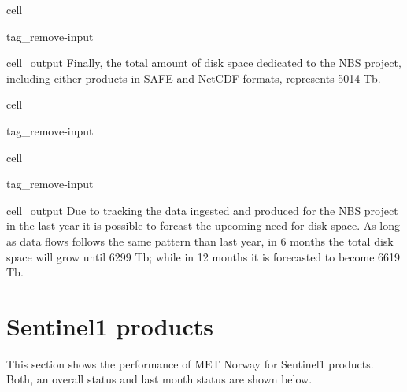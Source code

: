 \documentclass[letterpaper,10pt,english]{jupyterBook}
\begin{document}
\begin{sphinxuseclass}{cell}
\begin{sphinxuseclass}{tag_remove-input}\begin{sphinxVerbatimOutput}

\begin{sphinxuseclass}{cell_output}
\sphinxAtStartPar
Finally, the total amount of disk space dedicated to the NBS project, including either products in SAFE and NetCDF formats, represents 5014 Tb.

\end{sphinxuseclass}\end{sphinxVerbatimOutput}

\end{sphinxuseclass}
\end{sphinxuseclass}
\begin{sphinxuseclass}{cell}
\begin{sphinxuseclass}{tag_remove-input}
\end{sphinxuseclass}
\end{sphinxuseclass}
\begin{sphinxuseclass}{cell}
\begin{sphinxuseclass}{tag_remove-input}\begin{sphinxVerbatimOutput}

\begin{sphinxuseclass}{cell_output}
\sphinxAtStartPar
Due to tracking the data ingested and produced for the NBS project in the last year it is possible to forcast the upcoming need for disk space. As long as data flows follows the same pattern than last year, in 6 months the total disk space will grow until 6299 Tb; while in 12 months it is forecasted to become 6619 Tb.

\end{sphinxuseclass}\end{sphinxVerbatimOutput}

\end{sphinxuseclass}
\end{sphinxuseclass}
\sphinxstepscope


\chapter{Sentinel\sphinxhyphen{}1 products}
\label{\detokenize{S1_portals:sentinel-1-products}}\label{\detokenize{S1_portals::doc}}
\sphinxAtStartPar
This section shows the performance of MET Norway for Sentinel\sphinxhyphen{}1 products. Both, an overall status and last month status are shown below.
\end{document}
